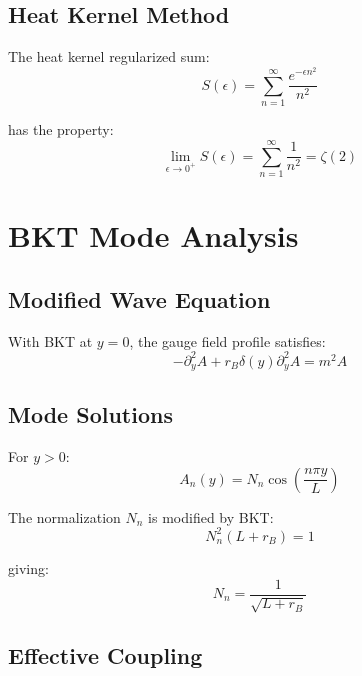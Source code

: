 \documentclass[11pt,a4paper]{article}
\begin{document}
\subsection{Heat Kernel Method}
\label{app:heat-kernel}

The heat kernel regularized sum:
\begin{equation}
\label{eq:heat-sum}
S(\epsilon) = \sum_{n=1}^{\infty} \frac{e^{-\epsilon n^2}}{n^2}
\end{equation}

has the property:
\begin{equation}
\label{eq:heat-limit}
\lim_{\epsilon \to 0^+} S(\epsilon) = \sum_{n=1}^{\infty} \frac{1}{n^2} = \zeta(2)
\end{equation}

\section{BKT Mode Analysis}
\label{app:bkt-modes}

\subsection{Modified Wave Equation}
\label{app:bkt-wave}

With BKT at $y=0$, the gauge field profile satisfies:
\begin{equation}
\label{eq:bkt-wave-eq}
-\partial_y^2 A + r_B \delta(y) \partial_y^2 A = m^2 A
\end{equation}

\subsection{Mode Solutions}
\label{app:bkt-solutions}

For $y > 0$:
\begin{equation}
\label{eq:bkt-mode-bulk}
A_n(y) = N_n \cos\left(\frac{n\pi y}{L}\right)
\end{equation}

The normalization $N_n$ is modified by BKT:
\begin{equation}
\label{eq:bkt-normalization}
N_n^2 \left(L + r_B\right) = 1
\end{equation}

giving:
\begin{equation}
\label{eq:bkt-norm-result}
N_n = \frac{1}{\sqrt{L + r_B}}
\end{equation}

\subsection{Effective Coupling}
\label{app:bkt-coupling}
\end{document}
